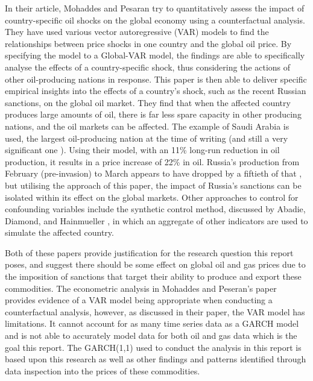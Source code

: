 In their article, Mohaddes and Pesaran \cite{aid2} try to quantitatively assess the impact of country-specific oil shocks on the global economy using a counterfactual analysis. They have used various vector autoregressive (VAR) models to find the relationships between price shocks in one country and the global oil price. By specifying the model to a Global-VAR model, the findings are able to specifically analyse the effects of a country-specific shock, thus considering the actions of other oil-producing nations in response. This paper is then able to deliver specific empirical insights into the effects of a country’s shock, such as the recent Russian sanctions, on the global oil market. They find that when the affected country produces large amounts of oil, there is far less spare capacity in other producing nations, and the oil markets can be affected. The example of Saudi Arabia is used, the largest oil-producing nation at the time of writing (and still a very significant one \cite{aid3}). Using their model, with an 11\% long-run reduction in oil production, it results in a price increase of 22\% in oil. Russia’s production from February (pre-invasion) to March appears to have dropped by a fiftieth of that \cite{aid4}, but utilising the approach of this paper, the impact of Russia’s sanctions can be isolated within its effect on the global markets. Other approaches to control for confounding variables include the synthetic control method, discussed by Abadie, Diamond, and Hainmueller \cite{aid5}, in which an aggregate of other indicators are used to simulate the affected country.
\medskip

Both of these papers provide justification for the research question this report poses, and suggest there should be some effect on global oil and gas prices due to the imposition of sanctions that target their ability to produce and export these commodities. The econometric analysis in Mohaddes and Peseran’s paper provides evidence of a VAR model being appropriate when conducting a counterfactual analysis, however, as discussed in their paper, the VAR model has limitations. It cannot account for as many time series data as a GARCH model and is not able to accurately model data for both oil and gas data which is the goal this report. The GARCH(1,1) used to conduct the analysis in this report is based upon this research as well as other findings and patterns identified through data inspection into the prices of these commodities.
